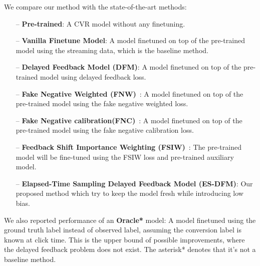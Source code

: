 \documentclass[letterpaper]{article} %
\newcommand{\modelname}{Elapsed-Time Sampling Delayed Feedback Model}
\newcommand{\modelnameabb}{ES-DFM}
\begin{document}
We compare our method with the state-of-the-art methods:

\begin{itemize}

\item[--] \textbf{Pre-trained}: A CVR model without any finetuning.

\item[--] \textbf{Vanilla Finetune Model}: A model finetuned on top of the pre-trained model using the streaming data, which is the baseline method.

\item[--] \textbf{Delayed Feedback Model (DFM)}\cite{DFM}: A model finetuned on top of the pre-trained model using delayed feedback loss.

\item[--] \textbf{Fake Negative Weighted (FNW)}~\cite{FNW}: A model finetuned on top of the pre-trained model using the fake negative weighted loss.

\item[--] \textbf{Fake Negative calibration(FNC)}~\cite{FNW}: A model finetuned on top of the pre-trained model using the fake negative calibration loss.

\item[--] \textbf{Feedback Shift Importance Weighting (FSIW)}~\cite{FSIW}: The pre-trained model will be fine-tuned using the FSIW loss and pre-trained auxiliary model.

\item[--] \textbf{\modelname{} (\modelnameabb{})}: Our proposed method which try to keep the model fresh while introducing low bias.

\end{itemize}

We also reported performance of an \textbf{Oracle*} model: A model finetuned using the ground truth label instead of observed label, assuming the conversion label is known at click time. This is the upper bound of possible improvements, where the delayed feedback problem does not exist. The asterisk* denotes that it's not a baseline method.
\end{document}
